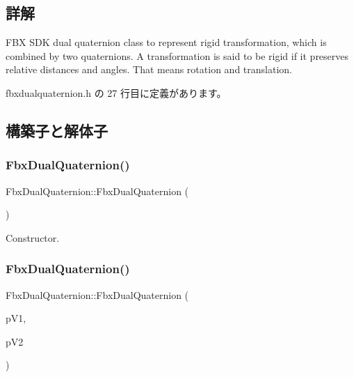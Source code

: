 \subsection{詳解}
F\+BX S\+DK dual quaternion class to represent rigid transformation, which is combined by two quaternions. A transformation is said to be rigid if it preserves relative distances and angles. That means rotation and translation. 

 fbxdualquaternion.\+h の 27 行目に定義があります。



\subsection{構築子と解体子}
\mbox{\label{class_fbx_dual_quaternion_a254ddc7798c408f023ee7ab3f10c4980}} 
\subsubsection{\texorpdfstring{Fbx\+Dual\+Quaternion()}{FbxDualQuaternion()}\hspace{0.1cm}{\footnotesize\ttfamily [1/5]}}
{\footnotesize\ttfamily Fbx\+Dual\+Quaternion\+::\+Fbx\+Dual\+Quaternion (\begin{DoxyParamCaption}{ }\end{DoxyParamCaption})}



Constructor. 

\mbox{\label{class_fbx_dual_quaternion_aa8cb9c92f1ad60ff2146473f24922224}} 
\subsubsection{\texorpdfstring{Fbx\+Dual\+Quaternion()}{FbxDualQuaternion()}\hspace{0.1cm}{\footnotesize\ttfamily [2/5]}}
{\footnotesize\ttfamily Fbx\+Dual\+Quaternion\+::\+Fbx\+Dual\+Quaternion (\begin{DoxyParamCaption}\item[{const \hyperlink{class_fbx_quaternion}{Fbx\+Quaternion} \&}]{p\+V1,  }\item[{const \hyperlink{class_fbx_quaternion}{Fbx\+Quaternion} \&}]{p\+V2 }\end{DoxyParamCaption})}

